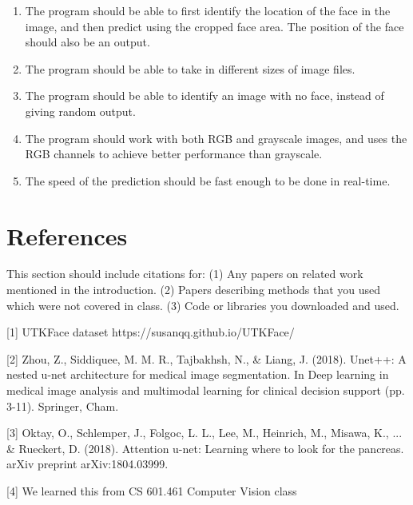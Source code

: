 \documentclass{article}
\begin{document}
\begin{enumerate}
    \item The program should be able to first identify the location of the face in the image, and then predict using the cropped face area. The position of the face should also be an output.
    \item The program should be able to take in different sizes of image files.
    \item The program should be able to identify an image with no face, instead of giving random output.
    \item The program should work with both RGB and grayscale images, and uses the RGB channels to achieve better performance than grayscale.
    \item The speed of the prediction should be fast enough to be done in real-time.
\end{enumerate}

\section*{References}
This section should include citations for: (1) Any papers on related work mentioned in the introduction.
(2) Papers describing methods that you used which were not covered in class.
(3) Code or libraries you downloaded and used.

\medskip
\small
[1] UTKFace dataset https://susanqq.github.io/UTKFace/

[2] Zhou, Z., Siddiquee, M. M. R., Tajbakhsh, N., \& Liang, J. (2018). Unet++: A nested u-net architecture for medical image segmentation. In Deep learning in medical image analysis and multimodal learning for clinical decision support (pp. 3-11). Springer, Cham.

[3] Oktay, O., Schlemper, J., Folgoc, L. L., Lee, M., Heinrich, M., Misawa, K., ... \& Rueckert, D. (2018). Attention u-net: Learning where to look for the pancreas. arXiv preprint arXiv:1804.03999.

[4] We learned this from CS 601.461 Computer Vision class
\end{document}
